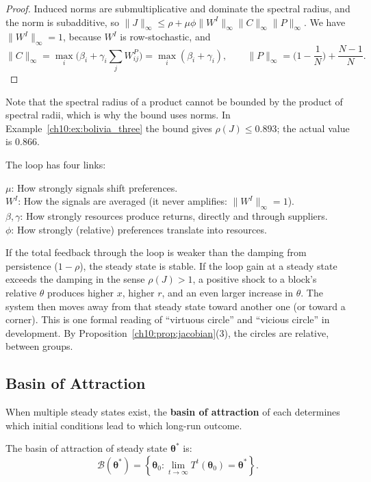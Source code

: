\documentclass[../structural_economics_book.tex]{subfiles}
\begin{document}
\begin{proof}
Induced norms are submultiplicative and dominate the spectral radius, and the norm is subadditive, so $\|J\|_\infty \le \rho + \mu\phi\|W^I\|_\infty\|C\|_\infty\|P\|_\infty$. We have $\|W^I\|_\infty = 1$, because $W^I$ is row-stochastic, and
\[
\|C\|_\infty = \max_i\Big(\beta_i + \gamma_i\sum_j W^P_{ij}\Big) = \max_i(\beta_i + \gamma_i), \qquad \|P\|_\infty = \Big(1 - \frac1N\Big) + \frac{N-1}{N}.
\]
\end{proof}

Note that the spectral radius of a product cannot be bounded by the product of spectral radii, which is why the bound uses norms. In Example~\ref{ch10:ex:bolivia_three} the bound gives $\rho(J) \leq 0.893$; the actual value is $0.866$.

\begin{intuition}
The loop has four links:

$\mu$: How strongly signals shift preferences.\\
$W^I$: How the signals are averaged (it never amplifies: $\|W^I\|_\infty = 1$).\\
$\beta, \gamma$: How strongly resources produce returns, directly and through suppliers.\\
$\phi$: How strongly (relative) preferences translate into resources.

If the total feedback through the loop is weaker than the damping from persistence ($1 - \rho$), the steady state is stable. If the loop gain at a steady state exceeds the damping in the sense $\rho(J) > 1$, a positive shock to a block's relative $\theta$ produces higher $x$, higher $r$, and an even larger increase in $\theta$. The system then moves away from that steady state toward another one (or toward a corner). This is one formal reading of ``virtuous circle'' and ``vicious circle'' in development. By Proposition~\ref{ch10:prop:jacobian}(3), the circles are relative, between groups.
\end{intuition}


\subsection{Basin of Attraction}

When multiple steady states exist, the \textbf{basin of attraction} of each determines which initial conditions lead to which long-run outcome.

\begin{definition}\label{ch10:def:basin}
The basin of attraction of steady state $\boldsymbol{\theta}^*$ is:
\begin{equation}
\mathcal{B}(\boldsymbol{\theta}^*) = \left\{\boldsymbol{\theta}_0 : \lim_{t \to \infty} T^t(\boldsymbol{\theta}_0) = \boldsymbol{\theta}^*\right\}.
\end{equation}
\end{definition}
\end{document}
